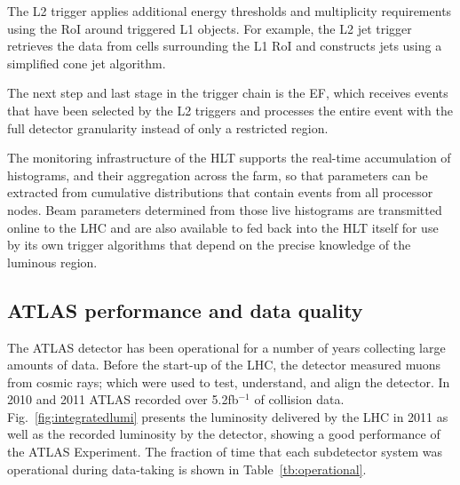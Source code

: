 The L2 trigger applies additional energy thresholds and multiplicity requirements using the RoI around triggered L1 objects. For example, the L2 jet trigger retrieves the data from cells surrounding the L1 RoI and constructs jets using a simplified cone jet algorithm. 

The next step and last stage in the trigger chain is the EF, which receives events that have been selected by the L2 triggers and processes the entire event with the full detector granularity instead of only a restricted region. 

The monitoring infrastructure of the HLT supports the real-time accumulation of histograms, and their aggregation across the farm, so that parameters can be extracted from cumulative distributions that contain events from all processor nodes. Beam parameters determined from those live  histograms are transmitted online to the LHC and are also available to fed back into the HLT itself for use by its own trigger algorithms that depend on the precise knowledge of the luminous region. %



 



  



\subsection{ATLAS performance and data quality}\label{sec:DQ}

The ATLAS detector has been operational for a number of years collecting large amounts of data. Before the start-up of the LHC, the detector measured 
muons from cosmic rays; which were used to test, understand, and align the detector. In 2010 and 2011 ATLAS recorded over 5.2fb$^{-1}$ of collision data. Fig.~\ref{fig:integratedlumi} presents the luminosity delivered by the LHC in 2011 as well as the recorded luminosity by the detector, showing a good performance of the ATLAS Experiment. 
The fraction of time that each subdetector system was operational during data-taking is shown in Table~\ref{tb:operational}.

